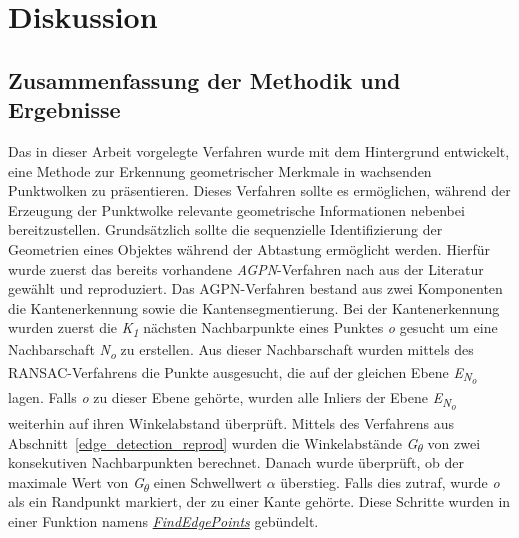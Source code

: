 
\chapter{Diskussion} \label{diskussion}
\section{Zusammenfassung der Methodik und Ergebnisse}
Das in dieser Arbeit vorgelegte Verfahren wurde mit dem Hintergrund entwickelt, eine Methode zur Erkennung geometrischer Merkmale in wachsenden Punktwolken zu präsentieren. Dieses Verfahren sollte es ermöglichen, während der Erzeugung der Punktwolke relevante geometrische Informationen nebenbei bereitzustellen. Grundsätzlich sollte die sequenzielle Identifizierung der Geometrien eines Objektes während der Abtastung ermöglicht werden. Hierfür wurde zuerst das bereits vorhandene \textit{AGPN}-Verfahren nach \autocite{ni_edge_2016} aus der Literatur gewählt und reproduziert. Das AGPN-Verfahren bestand aus zwei Komponenten \textendash{} die Kantenerkennung sowie die Kantensegmentierung. Bei der Kantenerkennung wurden zuerst die \textit{K\textsubscript{1}} nächsten Nachbarpunkte eines Punktes \textit{o} gesucht um eine Nachbarschaft \textit{N\textsubscript{o}} zu erstellen. Aus dieser Nachbarschaft wurden mittels des RANSAC-Verfahrens die Punkte ausgesucht, die auf der gleichen Ebene \textit{E\textsubscript{N\textsubscript{o}}} lagen. Falls \textit{o} zu dieser Ebene gehörte, wurden alle Inliers der Ebene \textit{E\textsubscript{N\textsubscript{o}}} weiterhin auf ihren Winkelabstand überprüft. Mittels des Verfahrens aus Abschnitt~\ref{edge_detection_reprod} wurden die Winkelabstände \textit{G\textsubscript{$\theta$}} von zwei konsekutiven Nachbarpunkten berechnet. Danach wurde überprüft, ob der maximale Wert von \textit{G\textsubscript{$\theta$}} einen Schwellwert \textit{$\alpha$} überstieg. Falls dies zutraf, wurde \textit{o} als ein Randpunkt markiert, der zu einer Kante gehörte. Diese Schritte wurden in einer Funktion namens \textit{\hyperref[alg:find_edge_points]{FindEdgePoints}} gebündelt. 

